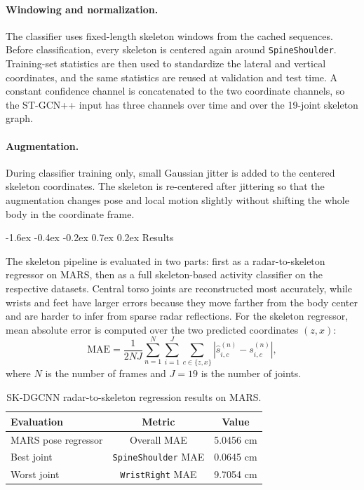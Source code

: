 \documentclass[10pt,twocolumn]{article}
\makeatletter
\renewcommand{\subsection}{%
  \@startsection{subsection}{2}{\z@}%
  {-1.6ex \@plus -0.4ex \@minus -0.2ex}%
  {0.7ex \@plus 0.2ex}%
  {\normalfont\normalsize\bfseries}}
\makeatother
\begin{document}
\paragraph{Windowing and normalization.}
The classifier uses fixed-length skeleton windows from the cached sequences.
Before classification, every skeleton is centered again around
\texttt{SpineShoulder}. Training-set statistics are then used to standardize the
lateral and vertical coordinates, and the same statistics are reused at
validation and test time. A constant confidence channel is concatenated to the
two coordinate channels, so the ST-GCN++ input has three channels over time and
over the 19-joint skeleton graph.

\paragraph{Augmentation.}
During classifier training only, small Gaussian jitter is added to the centered
skeleton coordinates. The skeleton is re-centered after jittering so that the
augmentation changes pose and local motion slightly without shifting the whole
body in the coordinate frame.

\subsection{Results}
\label{sec:skeleton-results}

The skeleton pipeline is evaluated in two parts: first as a radar-to-skeleton
regressor on MARS, then as a full skeleton-based activity classifier on the respective datasets.
Central torso joints are reconstructed most accurately, while wrists and
feet have larger errors because they move farther from the body center and are
harder to infer from sparse radar reflections. 
For the skeleton regressor, mean absolute error is computed over the two
predicted coordinates $(z,x)$:
\[
\mathrm{MAE}
= \frac{1}{2NJ}
\sum_{n=1}^{N}\sum_{i=1}^{J}\sum_{c\in\{z,x\}}
\left|\hat{s}^{(n)}_{i,c}-s^{(n)}_{i,c}\right|,
\]
where $N$ is the number of frames and $J=19$ is the number of joints.

\begin{table}[H]
\centering
\scriptsize
\setlength{\tabcolsep}{3pt}
\begin{tabular}{lcc}
\toprule
Evaluation & Metric & Value \\
\midrule
MARS pose regressor & Overall MAE & 5.0456 cm \\
Best joint & \texttt{SpineShoulder} MAE & 0.0645 cm \\
Worst joint & \texttt{WristRight} MAE & 9.7054 cm \\
\bottomrule
\end{tabular}
\caption{SK-DGCNN radar-to-skeleton regression results on MARS.}
\label{tab:skdgcnn-pose-results}
\end{table}
\end{document}
